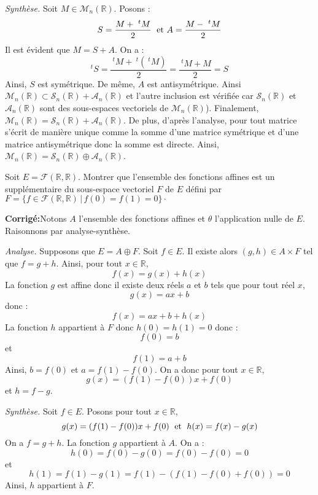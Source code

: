 \documentclass[a4paper,twoside,french,10pt]{VcCours}
\newcommand{\corr}{\textbf{Corrigé:}}
\begin{document}
\medskip

\textit{Synthèse.} Soit $M \in \mathcal{M}_n(\mathbb{R})$. Posons : 
$$ S = \dfrac{M + ~^t M}{2} \; \hbox{ et } A = \dfrac{M-~^tM}{2}$$
Il est évident que $M=S+A$. On a :
$$ ^t{} S = \dfrac{~^t M + ~^t(~^t M)}{2} = \dfrac{~^t M + M}{2} = S$$
Ainsi, $S$ est symétrique. De même, $A$ est antisymétrique.
 Ainsi $\mathcal{M}_n(\mathbb{R}) \subset \mathcal{S}_n(\mathbb{R}) + \mathcal{A}_n(\mathbb{R})$ et l'autre inclusion est vérifiée car $\mathcal{S}_n(\mathbb{R})$ et $\mathcal{A}_n(\mathbb{R})$ sont des sous-espaces vectoriels de $\mathcal{M}_n(\mathbb{R})$). Finalement, $\mathcal{M}_n(\mathbb{R}) = \mathcal{S}_n(\mathbb{R}) + \mathcal{A}_n(\mathbb{R})$. De plus, d'après l'analyse, pour tout matrice s'écrit de manière unique comme la somme d'une matrice symétrique et d'une matrice antisymétrique donc la somme est directe. Ainsi, $\mathcal{M}_n(\mathbb{R})= \mathcal{S}_n(\mathbb{R}) \oplus \mathcal{A}_n(\mathbb{R})$.
 
\medskip


\begin{Exercice}{} Soit $E = \mathcal{F}(\mathbb{R}, \mathbb{R})$. Montrer que l'ensemble des fonctions affines est un supplémentaire du sous-espace vectoriel $F$ de $E$ défini par $F = \lbrace f \in \mathcal{F}(\mathbb{R}, \mathbb{R}) \, \vert \, f(0)=f(1)=0 \rbrace\cdot$
\end{Exercice}

\corr Notons $A$ l'ensemble des fonctions affines et $\theta$ l'application nulle de $E$. Raisonnons par analyse-synthèse.

\medskip

\textit{Analyse.} Supposons que $E = A \oplus F$. Soit $f \in E$. Il existe alors $(g,h) \in A \times F$ tel que $f=g+h$. Ainsi, pour tout $x \in \mathbb{R}$,
$$ f(x) =g(x)+h(x)$$
La fonction $g$ est affine donc il existe deux réels $a$ et $b$ tels que pour tout réel $x$,
$$ g(x) = ax+b$$
donc :
$$ f(x) = ax+b + h(x)$$
La fonction $h$ appartient à $F$ donc $h(0)=h(1)=0$ donc :
$$ f(0) = b$$
et 
$$ f(1) = a+b$$
Ainsi, $b=f(0)$ et $a=f(1)-f(0)$. On a donc pour tout $x \in \mathbb{R}$,
$$ g(x) = (f(1)-f(0))x + f(0)$$
et $h=f-g$.

\medskip

\textit{Synthèse.} Soit $f \in E$. Posons pour tout $x \in \mathbb{R}$,
$$ g(x) = (f(1)-f(0))x + f(0) \; \hbox{ et } \; h(x)=f(x)-g(x)$$
On a $f=g+h$. La fonction $g$ appartient à $A$. On a :
$$ h(0) = f(0)-g(0) = f(0)-f(0)=0$$
et
$$ h(1) = f(1)-g(1) = f(1)- (f(1)-f(0)+f(0))= 0$$
Ainsi, $h$ appartient à $F$.
\end{document}
